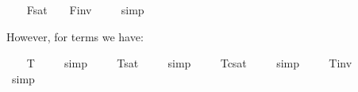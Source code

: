 \begin{isabellebody}
%
\isadelimproof
%
\endisadelimproof
\isanewline
\ \isamarkupfalse%
\ \ {\isachardoublequoteopen}{\isacharbrackleft}{\isasymphi}\isactrlsup F{\isacharbrackright}\isactrlsup s\isactrlsup a\isactrlsup t\ {\isacharequal}\ {\isasymtop}\ {\isasymlongleftrightarrow}\ {\isacharbrackleft}{\isasymphi}\isactrlsup F{\isacharbrackright}\isactrlsup i\isactrlsup n\isactrlsup v\ {\isacharequal}\ {\isasymbottom}{\isachardoublequoteclose}%
\isadelimproof
\ %
\endisadelimproof
%
\isatagproof
{}\isamarkupfalse%
\ simp\ \isamarkupfalse%
%
\endisatagproof
{\isafoldproof}%
%
\isadelimproof
%
\endisadelimproof
%
\begin{isamarkuptext}%
However, for terms we have:%
\end{isamarkuptext}%
\isamarkuptrue%
\ \isamarkupfalse%
\ \ {\isachardoublequoteopen}{\isacharbrackleft}{\isasymphi}\isactrlsup T{\isacharbrackright}\ {\isacharequal}\ {\isacharasterisk}{\isachardoublequoteclose}%
\isadelimproof
\ %
\endisadelimproof
%
\isatagproof
{}\isamarkupfalse%
\ simp\ \isamarkupfalse%
%
\endisatagproof
{\isafoldproof}%
%
\isadelimproof
%
\endisadelimproof
\isanewline
\ \isamarkupfalse%
\ \ {\isachardoublequoteopen}{\isacharbrackleft}{\isasymphi}\isactrlsup T{\isacharbrackright}\isactrlsup s\isactrlsup a\isactrlsup t\ {\isacharequal}\ {\isacharasterisk}{\isachardoublequoteclose}%
\isadelimproof
\ %
\endisadelimproof
%
\isatagproof
{}\isamarkupfalse%
\ simp\ \isamarkupfalse%
%
\endisatagproof
{\isafoldproof}%
%
\isadelimproof
%
\endisadelimproof
\isanewline
\ \isamarkupfalse%
\ \ {\isachardoublequoteopen}{\isacharbrackleft}{\isasymphi}\isactrlsup T{\isacharbrackright}\isactrlsup c\isactrlsup s\isactrlsup a\isactrlsup t\ {\isacharequal}\ {\isacharasterisk}{\isachardoublequoteclose}%
\isadelimproof
\ %
\endisadelimproof
%
\isatagproof
{}\isamarkupfalse%
\ simp\ \isamarkupfalse%
%
\endisatagproof
{\isafoldproof}%
%
\isadelimproof
%
\endisadelimproof
\isanewline
\ \isamarkupfalse%
\ \ {\isachardoublequoteopen}{\isacharbrackleft}{\isasymphi}\isactrlsup T{\isacharbrackright}\isactrlsup i\isactrlsup n\isactrlsup v\ {\isacharequal}\ {\isacharasterisk}{\isachardoublequoteclose}%
\isadelimproof
\ %
\endisadelimproof
%
\isatagproof
{}\isamarkupfalse%
\ simp\ \isamarkupfalse%
%
\endisatagproof
{\isafoldproof}%
%
\isadelimproof
%
\endisadelimproof
%
\end{isabellebody}
